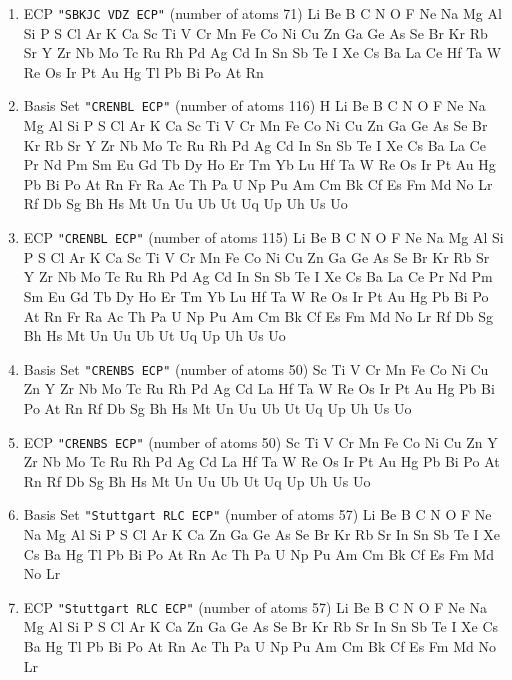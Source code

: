 \begin{enumerate}
\item ECP \verb#"SBKJC VDZ ECP"# (number of atoms 71)  \newline
  Li Be B C N O F Ne Na Mg Al Si P S Cl Ar K Ca Sc Ti V Cr Mn Fe Co
 Ni Cu Zn Ga Ge As Se Br Kr Rb Sr Y Zr Nb Mo Tc Ru Rh Pd Ag Cd In Sn Sb Te
 I Xe Cs Ba La Ce Hf Ta W Re Os Ir Pt Au Hg Tl Pb Bi Po At Rn


\item Basis Set \verb#"CRENBL ECP"# (number of atoms 116)  \newline
  H Li Be B C N O F Ne Na Mg Al Si P S Cl Ar K Ca Sc Ti V Cr Mn Fe
 Co Ni Cu Zn Ga Ge As Se Br Kr Rb Sr Y Zr Nb Mo Tc Ru Rh Pd Ag Cd In Sn Sb
 Te I Xe Cs Ba La Ce Pr Nd Pm Sm Eu Gd Tb Dy Ho Er Tm Yb Lu Hf Ta W Re Os
 Ir Pt Au Hg Pb Bi Po At Rn Fr Ra Ac Th Pa U Np Pu Am Cm Bk Cf Es Fm Md No
 Lr Rf Db Sg Bh Hs Mt Un Uu Ub Ut Uq Up Uh Us Uo

\item ECP \verb#"CRENBL ECP"# (number of atoms 115)  \newline
  Li Be B C N O F Ne Na Mg Al Si P S Cl Ar K Ca Sc Ti V Cr Mn Fe Co
 Ni Cu Zn Ga Ge As Se Br Kr Rb Sr Y Zr Nb Mo Tc Ru Rh Pd Ag Cd In Sn Sb Te
 I Xe Cs Ba La Ce Pr Nd Pm Sm Eu Gd Tb Dy Ho Er Tm Yb Lu Hf Ta W Re Os Ir
 Pt Au Hg Pb Bi Po At Rn Fr Ra Ac Th Pa U Np Pu Am Cm Bk Cf Es Fm Md No Lr
 Rf Db Sg Bh Hs Mt Un Uu Ub Ut Uq Up Uh Us Uo


\item Basis Set \verb#"CRENBS ECP"# (number of atoms 50)  \newline
  Sc Ti V Cr Mn Fe Co Ni Cu Zn Y Zr Nb Mo Tc Ru Rh Pd Ag Cd La Hf Ta W Re
 Os Ir Pt Au Hg Pb Bi Po At Rn Rf Db Sg Bh Hs Mt Un Uu Ub Ut Uq Up Uh Us Uo
\item ECP \verb#"CRENBS ECP"# (number of atoms 50)  \newline
  Sc Ti V Cr Mn Fe Co Ni Cu Zn Y Zr Nb Mo Tc Ru Rh Pd Ag Cd La Hf Ta W Re
 Os Ir Pt Au Hg Pb Bi Po At Rn Rf Db Sg Bh Hs Mt Un Uu Ub Ut Uq Up Uh Us Uo

\item Basis Set \verb#"Stuttgart RLC ECP"# (number of atoms 57)  \newline
  Li Be B C N O F Ne Na Mg Al Si P S Cl Ar K Ca Zn Ga Ge As Se Br Kr
 Rb Sr In Sn Sb Te I Xe Cs Ba Hg Tl Pb Bi Po At Rn Ac Th Pa U Np Pu Am Cm
 Bk Cf Es Fm Md No Lr


\item ECP \verb#"Stuttgart RLC ECP"# (number of atoms 57)  \newline
  Li Be B C N O F Ne Na Mg Al Si P S Cl Ar K Ca Zn Ga Ge As Se Br Kr
 Rb Sr In Sn Sb Te I Xe Cs Ba Hg Tl Pb Bi Po At Rn Ac Th Pa U Np Pu Am Cm
 Bk Cf Es Fm Md No Lr


\end{enumerate}
